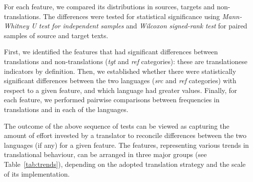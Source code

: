 For each feature, we compared its distributions in sources, targets and non-translations. The differences were tested for statistical significance using \textit{Mann-Whitney U test for independent samples} and \textit{Wilcoxon signed-rank test} for paired samples of source and target texts. 

First, we identified the features that had significant differences between translations and non-translations (\textit{tgt} and \textit{ref} categories): these are translationese indicators by definition. 
Then, we established whether there were statistically significant differences between the two languages (\textit{src} and \textit{ref} categories) with respect to a given feature, and which language had greater values.
Finally, for each feature, we performed pairwise comparisons between frequencies in translations and in each of the languages.

The outcome of the above sequence of tests can be viewed as capturing the amount of effort invested by a translator to reconcile differences between the two languages (if any) for a given feature. The features, representing various trends in translational behaviour, can be arranged in three major groups (see Table~\ref{tab:trends}), depending on the adopted translation strategy and the scale of its implementation. 

